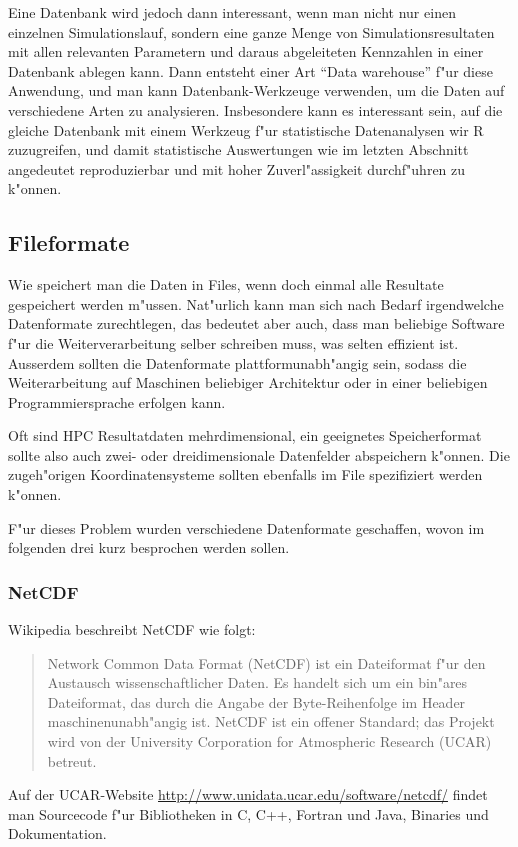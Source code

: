 Eine Datenbank wird jedoch dann interessant, wenn man nicht nur einen
einzelnen Simulationslauf, sondern eine ganze Menge von Simulationsresultaten
mit allen relevanten Parametern und daraus abgeleiteten Kennzahlen
in einer Datenbank ablegen kann.
Dann entsteht einer Art ``Data warehouse'' f"ur diese Anwendung,
und man kann Datenbank-Werkzeuge verwenden, um die Daten auf
verschiedene Arten zu analysieren. 
Insbesondere kann es interessant sein, auf die gleiche Datenbank
mit einem Werkzeug f"ur statistische Datenanalysen wir R zuzugreifen,
und damit statistische Auswertungen wie im letzten Abschnitt
angedeutet reproduzierbar und mit hoher Zuverl"assigkeit durchf"uhren
zu k"onnen.

\subsection{Fileformate}
Wie speichert man die Daten in Files, wenn doch einmal alle Resultate
gespeichert werden m"ussen.
Nat"urlich kann man sich nach Bedarf irgendwelche Datenformate zurechtlegen,
das bedeutet aber auch, dass man beliebige Software f"ur die
Weiterverarbeitung selber schreiben muss, was selten effizient ist.
Ausserdem sollten die Datenformate plattformunabh"angig sein,
sodass die Weiterarbeitung auf Maschinen beliebiger Architektur
oder in einer beliebigen Programmiersprache erfolgen kann.

Oft sind HPC Resultatdaten mehrdimensional, ein geeignetes Speicherformat
sollte also auch zwei- oder dreidimensionale Datenfelder abspeichern
k"onnen.
Die zugeh"origen Koordinatensysteme sollten ebenfalls im File
spezifiziert werden k"onnen.

F"ur dieses Problem wurden verschiedene Datenformate geschaffen, 
wovon im folgenden drei kurz besprochen werden sollen.

\subsubsection{NetCDF}
Wikipedia beschreibt NetCDF wie folgt:
\begin{quote}
Network Common Data Format (NetCDF) ist ein Dateiformat f"ur den
Austausch wissenschaftlicher Daten. Es handelt sich um ein bin"ares
Dateiformat, das durch die Angabe der Byte-Reihenfolge im Header
maschinenunabh"angig ist. NetCDF ist ein offener Standard; das Projekt
wird von der University Corporation for Atmospheric Research (UCAR)
betreut.
\end{quote}
Auf der UCAR-Website \url{http://www.unidata.ucar.edu/software/netcdf/}
findet man Sourcecode f"ur Bibliotheken in C, C++, Fortran und Java,
Binaries und Dokumentation. 

